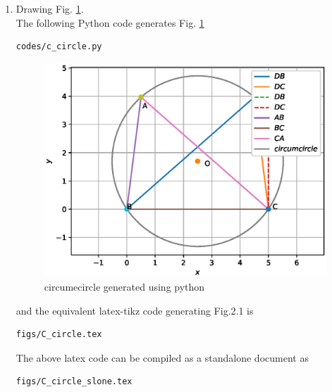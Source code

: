 \begin{enumerate}[label=\thesection.\arabic*.,ref=\thesection.\theenumi]
%
\item Drawing  Fig. \ref{fig:c_circle}.	
\\
 The  following Python code generates Fig. \ref{fig:c_circle}
%
\begin{lstlisting}
codes/c_circle.py
\end{lstlisting}
\begin{figure}[!ht]
\centering
\includegraphics[width=\columnwidth]{./figures/c_circle.eps}
\caption{circumecircle generated using python}
\label{fig:c_circle}
\end{figure}

%
and the equivalent latex-tikz code generating Fig.2.1  is 
\begin{lstlisting}
figs/C_circle.tex
\end{lstlisting}
%
The above latex code can be compiled as a standalone document as
\begin{lstlisting}
figs/C_circle_slone.tex
\end{lstlisting}

%

%

%
%

\end{enumerate}


